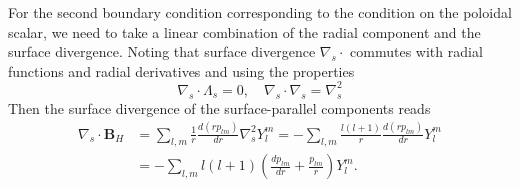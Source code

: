 For the second boundary condition corresponding to the condition on the poloidal scalar, we need to take a linear combination of the radial component and the surface divergence. Noting that surface divergence $\nabla_s\cdot$ commutes with radial functions and radial derivatives and using the properties \citep[see e.g.][]{backus_poloidal_1986}
%
\begin{equation}
    \nabla_s \cdot \Lambda_s = 0,\quad \nabla_s\cdot \nabla_s = \nabla_s^2
\end{equation}
%
Then the surface divergence of the surface-parallel components reads
%
\begin{equation}
\begin{aligned}
    \nabla_s\cdot \mathbf{B}_H &= \sum_{l,m} \frac{1}{r}\frac{d(rp_{lm})}{dr} \nabla_s^2 Y_l^m = - \sum_{l,m} \frac{l(l+1)}{r} \frac{d(rp_{lm})}{dr} Y_l^m \\ 
    &= - \sum_{l,m} l(l+1) \left(\frac{dp_{lm}}{dr} + \frac{p_{lm}}{r}\right) Y_l^m.
\end{aligned}
\end{equation}
%

